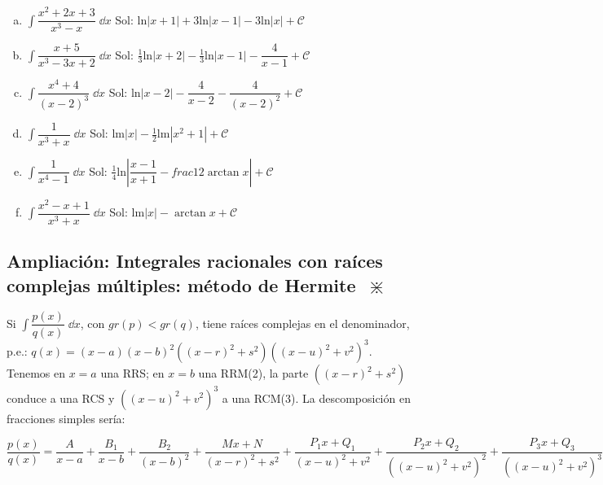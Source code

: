 {\begin{enumerate}[a) ]
\item $\displaystyle \int  \dfrac { x^2+2x+3 } { x^3-x }    \; \dd x$
\textcolor{gris}{Sol: $ \mathrm{ln}|x+1|+ 3 \mathrm{ln}|x-1|-3\mathrm{ln}|x| +\mathcal C$}

\item $\displaystyle \int  \dfrac { x+5 } { x^3-3x+2 }    \; \dd x$
\textcolor{gris}{Sol: $ \frac 1 3 \mathrm{ln}|x+2|- \frac 1 3 \mathrm{ln}|x-1|-\dfrac {4}{x-1} +\mathcal C$}

\item $\displaystyle \int  \dfrac { x^4+4 } { (x-2)^3 }    \; \dd x$
\textcolor{gris}{Sol: $ \mathrm{ln}|x-2|-\dfrac {4}{x-2}-\dfrac {4}{(x-2)^2} +\mathcal C$}

\item $\displaystyle \int  \dfrac { 1 } { x^3+x }    \; \dd x$
\textcolor{gris}{Sol: $ \mathrm{lm}|x|- \frac 1 2 \mathrm{lm}|x^2+1|+\mathcal C$}

\item $\displaystyle \int  \dfrac { 1 } { x^4-1 }    \; \dd x$
\textcolor{gris}{Sol: $ \frac 1 4 \mathrm{ln} \left|\dfrac {x-1}{x+1}- frac 1 2 \arctan x  \right| +\mathcal C$}
	
\item $\displaystyle \int  \dfrac { x^2-x+1 } { x^3+x }    \; \dd x$
\textcolor{gris}{Sol: $ \mathrm{lm}|x|-\arctan x +\mathcal C$}

\end{enumerate}



\subsection{Ampliación: Integrales racionales con raíces complejas múltiples: método de Hermite $\; \divideontimes$ }
\textcolor{gris}{
Si  $\displaystyle \int  \dfrac { p(x) } { q(x) }    \; \dd x$, con $gr(p)<gr(q)$, tiene raíces complejas en el denominador, p.e.:}
\textcolor{gris}{
$\displaystyle q(x)=(x-a)(x-b)^2\left((x-r)^2+s^2 \right) \left((x-u)^2+v^2 \right)^3$. Tenemos en $x=a$ una RRS; en $x=b$ una RRM(2), la parte $\left((x-r)^2+s^2 \right) $ conduce a una RCS y $\left((x-u)^2+v^2 \right)^3$ a una RCM(3). La descomposición en fracciones simples sería:}

\textcolor{gris}{
 $\displaystyle   \dfrac { p(x) } { q(x) } =
 \dfrac {A}{x-a} +   \dfrac {B_1}{x-b} +     \dfrac {B_2}{(x-b)^2}  + \dfrac {Mx+N}{(x-r)^2+s^2 } +  \dfrac {P_1x+Q_1}{(x-u)^2+v^2} +   \dfrac {P_2x+Q_2}{\left((x-u)^2+v^2 \right)^2} +   \dfrac {P_3x+Q_3}{\left((x-u)^2+v^2 \right)^3}  $}
 
}
